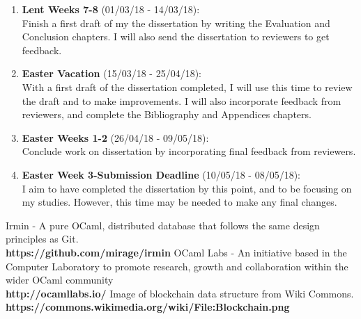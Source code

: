 \documentclass[12pt, letterpaper, twoside]{article}
\begin{document}
\begin{enumerate}
		\item \textbf{Lent Weeks 7-8} (01/03/18 - 14/03/18):\\
		Finish a first draft of my the dissertation by writing the Evaluation and Conclusion chapters. I will also send the dissertation to reviewers to get feedback.
		\item \textbf{Easter Vacation} (15/03/18 - 25/04/18):\\
		With a first draft of the dissertation completed, I will use this time to review the draft and to make improvements. I will also incorporate feedback from reviewers, and complete the Bibliography and Appendices chapters.
		\item \textbf{Easter Weeks 1-2} (26/04/18 - 09/05/18):
		\\
		Conclude work on dissertation by incorporating final feedback from reviewers.
		\item \textbf{Easter Week 3-Submission Deadline} (10/05/18 - 08/05/18):\\
		I aim to have completed the dissertation by this point, and to be focusing on my studies. However, this time may be needed to make any final changes.
	\end{enumerate}
	\begin{thebibliography}{9}
		Irmin - A pure OCaml, distributed database that follows the same design principles as Git.\\ \textbf{https://github.com/mirage/irmin}
		OCaml Labs - An initiative based in the Computer Laboratory to promote research, growth and collaboration within the wider OCaml community\\
		\textbf{http://ocamllabs.io/}
		Image of blockchain data structure from Wiki Commons.
		\textbf{https://commons.wikimedia.org/wiki/File:Blockchain.png}
		
	\end{thebibliography}
\end{document}
